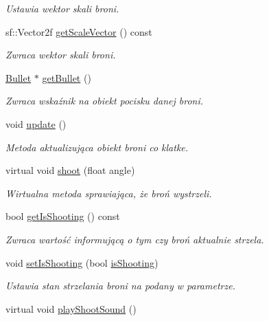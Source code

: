 \begin{DoxyCompactItemize}
\begin{DoxyCompactList}\small\item\em Ustawia wektor skali broni. \end{DoxyCompactList}\item 
sf\+::\+Vector2f \mbox{\hyperlink{class_weapon_a91adf453c2d656f577686b31d1f87e25}{get\+Scale\+Vector}} () const
\begin{DoxyCompactList}\small\item\em Zwraca wektor skali broni. \end{DoxyCompactList}\item 
\mbox{\hyperlink{class_bullet}{Bullet}} $\ast$ \mbox{\hyperlink{class_weapon_a9cf68e4a72e5513266ca3e59f48da323}{get\+Bullet}} ()
\begin{DoxyCompactList}\small\item\em Zwraca wskaźnik na obiekt pocisku danej broni. \end{DoxyCompactList}\item 
void \mbox{\hyperlink{class_weapon_a1b3f76c5275b67f0bb8073157a27e736}{update}} ()
\begin{DoxyCompactList}\small\item\em Metoda aktualizująca obiekt broni co klatke. \end{DoxyCompactList}\item 
virtual void \mbox{\hyperlink{class_weapon_a954c06c805704aeea451f88221e5c74c}{shoot}} (float angle)
\begin{DoxyCompactList}\small\item\em Wirtualna metoda sprawiająca, że broń wystrzeli. \end{DoxyCompactList}\item 
bool \mbox{\hyperlink{class_weapon_a71c1102f1e752307efbb83c7140bca66}{get\+Is\+Shooting}} () const
\begin{DoxyCompactList}\small\item\em Zwraca wartość informującą o tym czy broń aktualnie strzela. \end{DoxyCompactList}\item 
void \mbox{\hyperlink{class_weapon_abadbad398e52fb1ef6364cd2e0d2defb}{set\+Is\+Shooting}} (bool \mbox{\hyperlink{class_weapon_aa546d4d559c3fe1d7aefa13f62eb2890}{is\+Shooting}})
\begin{DoxyCompactList}\small\item\em Ustawia stan strzelania broni na podany w parametrze. \end{DoxyCompactList}\item 
virtual void \mbox{\hyperlink{class_weapon_aaf32c85f3e70d3c8392c928b9e6e75ca}{play\+Shoot\+Sound}} ()

\end{DoxyCompactItemize}
